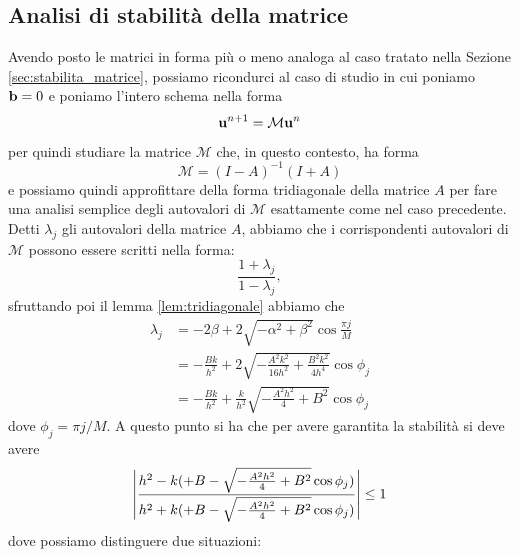 \documentclass[10pt,a4paper]{article}
\begin{document}
\subsection{Analisi di stabilità della matrice}

Avendo posto le matrici in forma più o meno analoga al caso tratato nella Sezione \ref{sec:stabilita_matrice}, possiamo ricondurci al caso di studio in cui poniamo $\vb{b} = 0$ e poniamo l'intero schema nella forma
\begin{equation}
	\vb{u}^{n+1} = \mathcal{M}\vb{u}^n
\end{equation}
per quindi studiare la matrice $\mathcal{M}$ che, in questo contesto, ha forma
\begin{equation}
	\mathcal{M} = (I-A)^{-1}(I+A)
\end{equation}
e possiamo quindi approfittare della forma tridiagonale della matrice $A$ per fare una analisi semplice degli autovalori di $\mathcal{M}$ esattamente come nel caso precedente. Detti $\lambda_j$ gli autovalori della matrice $A$, abbiamo che i corrispondenti autovalori di $\mathcal{M}$ possono essere scritti nella forma:
\begin{equation}
	\frac{1+\lambda_j}{1-\lambda_j},
\end{equation}
sfruttando poi il lemma \ref{lem:tridiagonale} abbiamo che
\begin{align}
	\lambda_j &= -2\beta + 2\sqrt{-\alpha^2 +\beta^2}\cos{\frac{\pi j}{M}}\\
	&= -\frac{Bk}{h^2} +2\sqrt{-\frac{A^2 k^2}{16 h^2} + \frac{B^2 k^2}{4 h^4}}\cos{\phi_j}\\
	&= -\frac{Bk}{h^2} +\frac{k}{h^2}\sqrt{-\frac{A^2 h^2}{4}+B^2}\cos{\phi_j}
\end{align}
dove $\phi_j = \pi j/M$. A questo punto si ha che per avere garantita la stabilità si deve avere
\begin{equation}
	\abs{\frac{h^2 - k (+ B - \sqrt{-\frac{A^2 h^2}{4}+B^2} \cos{\phi_j})}{h^2 + k (+ B - \sqrt{-\frac{A^2 h^2}{4}+B^2} \cos{\phi_j})}} \leq 1
\end{equation}
dove possiamo distinguere due situazioni: 
\end{document}
